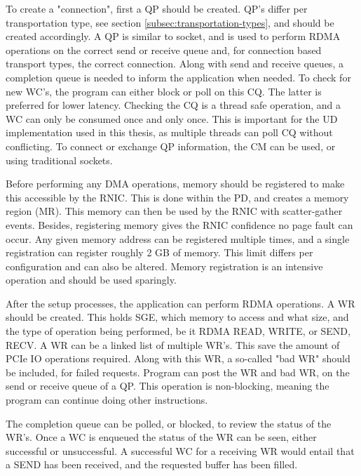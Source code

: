 To create a "connection", first a QP should be created.
QP's differ per transportation type, see section \ref{subsec:transportation-types}, and should be created accordingly.
A QP is similar to socket, and is used to perform RDMA operations on the correct send or receive queue and, for connection based transport types, the correct connection.
Along with send and receive queues, a completion queue is needed to inform the application when needed.
To check for new WC's, the program can either block or poll on this CQ.
The latter is preferred for lower latency.
Checking the CQ is a thread safe operation, and a WC can only be consumed once and only once.
This is important for the UD implementation used in this thesis, as multiple threads can poll CQ without conflicting.
To connect or exchange QP information, the CM can be used, or using traditional sockets.

Before performing any DMA operations, memory should be registered to make this accessible by the RNIC.
This is done within the PD, and creates a memory region (MR).
This memory can then be used by the RNIC with scatter-gather events.
Besides, registering memory gives the RNIC confidence no page fault can occur.
Any given memory address can be registered multiple times, and a single registration can register roughly 2 GB of memory.
This limit differs per configuration and can also be altered.
Memory registration is an intensive operation and should be used sparingly.

After the setup processes, the application can perform RDMA operations.
A WR should be created.
This holds SGE, which memory to access and what size, and the type of operation being performed, be it RDMA READ, WRITE, or SEND, RECV.
A WR can be a linked list of multiple WR's.
This save the amount of PCIe IO operations required.
Along with this WR, a so-called "bad WR" should be included, for failed requests.
Program can post the WR and bad WR, on the send or receive queue of a QP.
This operation is non-blocking, meaning the program can continue doing other instructions.

The completion queue can be polled, or blocked, to review the status of the WR's.
Once a WC is enqueued the status of the WR can be seen, either successful or unsuccessful.
A successful WC for a receiving WR would entail that a SEND has been received, and the requested buffer has been filled.








